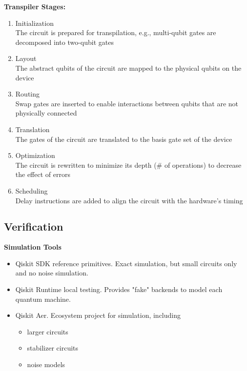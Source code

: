 \documentclass{article}
\newlength{\tindent}
\renewcommand{\indent}{\hspace*{\tindent}}
\begin{document}
\textbf{Transpiler Stages:}
\begin{enumerate}
    \item Initialization\\
        \indent The circuit is prepared for transpilation, e.g., multi-qubit gates are decomposed into two-qubit gates
    \item Layout\\
        \indent The abstract qubits of the circuit are mapped to the physical qubits on the device
    \item Routing\\
        \indent Swap gates are inserted to enable interactions between qubits that are not physically connected
    \item Translation\\
        \indent The gates of the circuit are translated to the basis gate set of the device
    \item Optimization\\
        \indent The circuit is rewritten to minimize its depth (\# of operations) to decrease the effect of errors
    \item Scheduling\\
        \indent Delay instructions are added to align the circuit with the hardware's timing
\end{enumerate}

\subsection*{Verification}
\label{ss:verify}
\textbf{Simulation Tools}
\begin{itemize}
    \item[] Qiskit SDK reference primitives. Exact simulation, but small circuits only and no noise simulation.
    \item[] Qiskit Runtime local testing. Provides "fake" backends to model each quantum machine.
    \item[] Qiskit Aer. Ecosystem project for simulation, including
        \begin{itemize}
            \item larger circuits
            \item stabilizer circuits
            \item noise models
        \end{itemize}
\end{itemize}
\end{document}
